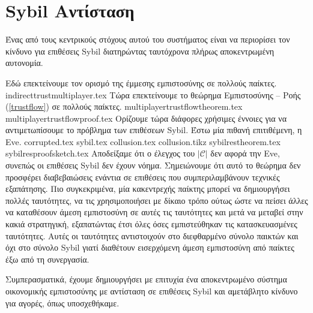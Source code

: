 \section{\textlatin{Sybil} Αντίσταση}
  Ένας από τους κεντρικούς στόχους αυτού του συστήματος είναι να περιορίσει τον κίνδυνο για επιθέσεις \textlatin{Sybil}
  διατηρώντας ταυτόχρονα πλήρως αποκεντρωμένη αυτονομία.

  Εδώ επεκτείνουμε τον ορισμό της έμμεσης εμπιστοσύνης σε πολλούς παίκτες.
  {indirecttrustmultiplayer.tex}
  Τώρα επεκτείνουμε το θεώρημα Εμπιστοσύνης -- Ροής (\ref{trustflow}) σε πολλούς παίκτες.
  {multiplayertrustflowtheorem.tex}
  {multiplayertrustflowproof.tex}
  Ορίζουμε τώρα διάφορες χρήσιμες έννοιες για να αντιμετωπίσουμε το πρόβλημα των επιθέσεων \textlatin{Sybil}. Έστω μία πιθανή
  επιτιθέμενη, η \textlatin{Eve}.
  {corrupted.tex}
  {sybil.tex}
  {collusion.tex}
  {collusion.tikz}
  {sybilrestheorem.tex}
  {sybilresproofsketch.tex}
  Αποδείξαμε ότι ο έλεγχος του $|\mathcal{C}|$ δεν αφορά την \textlatin{Eve}, συνεπώς οι επιθέσεις \textlatin{Sybil} δεν έχουν
  νόημα. Σημειώνουμε ότι αυτό το θεώρημα δεν προσφέρει διαβεβαιώσεις ενάντια σε επιθέσεις που συμπεριλαμβάνουν τεχνικές
  εξαπάτησης. Πιο συγκεκριμένα, μία κακεντρεχής παίκτης μπορεί να δημιουργήσει πολλές ταυτότητες, να τις χρησιμοποιήσει με
  δίκαιο τρόπο ούτως ώστε να πείσει άλλες να καταθέσουν άμεση εμπιστοσύνη σε αυτές τις ταυτότητες και μετά να μεταβεί στην
  κακιά στρατηγική, εξαπατώντας έτσι όλες όσες εμπιστεύθηκαν τις κατασκευασμένες ταυτότητες. Αυτές οι ταυτότητες αντιστοιχούν
  στο διεφθαρμένο σύνολο παικτών και όχι στο σύνολο \textlatin{Sybil} γιατί διαθέτουν εισερχόμενη άμεση εμπιστοσύνη από
  παίκτες έξω από τη συνεργασία.

  Συμπερασματικά, έχουμε δημιουργήσει με επιτυχία ένα αποκεντρωμένο σύστημα οικονομικής εμπιστοσύνης με αντίσταση σε επιθέσεις
  \textlatin{Sybil} και αμετάβλητο κίνδυνο για αγορές, όπως υποσχεθήκαμε.

